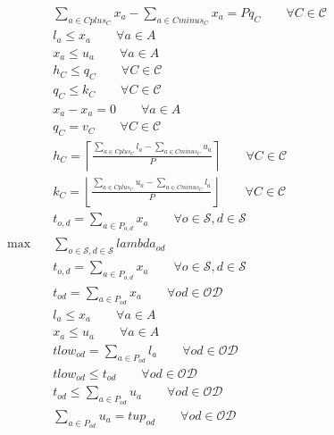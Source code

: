 \begin{align}
  & \sum_{a \in Cplus_{C}} x_{a} - \sum_{a \in Cminus_{C}} x_{a} = \mathit{Pq}_{C} \qquad \forall C \in \mathcal{C} \tag{eq\_0001} \\
  & l_{a} \leq x_{a} \qquad \forall a \in A \tag{eq\_0002\_a} \\
  & x_{a} \leq u_{a} \qquad \forall a \in A \tag{eq\_0002\_b} \\
  & h_{C} \leq q_{C} \qquad \forall C \in \mathcal{C} \tag{eq\_0003\_a} \\
  & q_{C} \leq k_{C} \qquad \forall C \in \mathcal{C} \tag{eq\_0003\_b} \\
  & x_{a} - x_{a} = 0 \qquad \forall a \in A \tag{eq\_0004} \\
  & q_{C} = v_{C} \qquad \forall C \in \mathcal{C} \tag{eq\_0005} \\
  & h_{C} = \left\lceil\frac{\sum_{a \in Cplus_{C}} l_{a} - \sum_{a \in Cminus_{C}} u_{a}}{P}\right\rceil \qquad \forall C \in \mathcal{C} \tag{eq\_0006\_a} \\
  & k_{C} = \left\lfloor\frac{\sum_{a \in Cplus_{C}} u_{a} - \sum_{a \in Cminus_{C}} l_{a}}{P}\right\rfloor \qquad \forall C \in \mathcal{C} \tag{eq\_0006\_b} \\
  & t_{o,d} = \sum_{a \in P_{o,d}} x_{a} \qquad \forall o \in \mathcal{S}, d \in \mathcal{S} \tag{eq\_0008} \\
  \max\quad & \sum_{o \in \mathcal{S}, d \in \mathcal{S}} \mathit{lambda}_{\mathit{od}} \tag{eq\_0011} \\
  & t_{o,d} = \sum_{a \in P_{o,d}} x_{a} \qquad \forall o \in \mathcal{S}, d \in \mathcal{S} \tag{eq\_0013} \\
  & t_{\mathit{od}} = \sum_{a \in P_{\mathit{od}}} x_{a} \qquad \forall \mathit{od} \in \mathcal{OD} \tag{eq\_0019\_a} \\
  & l_{a} \leq x_{a} \qquad \forall a \in A \tag{eq\_0019\_b} \\
  & x_{a} \leq u_{a} \qquad \forall a \in A \tag{eq\_0019\_c} \\
  & tlow_{\mathit{od}} = \sum_{a \in P_{\mathit{od}}} l_{a} \qquad \forall \mathit{od} \in \mathcal{OD} \tag{eq\_0019\_d} \\
  & tlow_{\mathit{od}} \leq t_{\mathit{od}} \qquad \forall \mathit{od} \in \mathcal{OD} \tag{eq\_0019\_e} \\
  & t_{\mathit{od}} \leq \sum_{a \in P_{\mathit{od}}} u_{a} \qquad \forall \mathit{od} \in \mathcal{OD} \tag{eq\_0019\_f} \\
  & \sum_{a \in P_{\mathit{od}}} u_{a} = tup_{\mathit{od}} \qquad \forall \mathit{od} \in \mathcal{OD} \tag{eq\_0019\_g} \\
\end{align}
